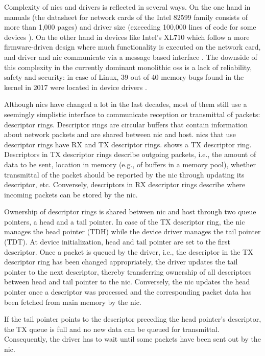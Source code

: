 Complexity of \acp{nic} and drivers is reflected in several ways. On the one
hand in manuals (the datasheet for network cards of the Intel 82599 family
\cite{intel2019datasheet} consists of more than 1,000 pages) and driver size
(exceeding 100,000 lines of code for some devices \cite{emmerich2019case}). On
the other hand in devices like Intel's XL710 which follow a more firmware-driven
design where much functionality is executed on the network card, and driver and
\ac{nic} communicate via a message based interface \cite{emmerich2019user}. The
downside of this complexity in the currently dominant monolithic \aclp{os} is a
lack of reliability, safety and security: in case of Linux, 39 out of 40 memory
bugs found in the kernel in 2017 were located in device drivers
\cite{emmerich2019case}.

Although \acp{nic} have changed a lot in the last decades, most of them still
use a seemingly simplistic interface to communicate reception or transmittal of
packets: descriptor rings. Descriptor rings are circular buffers that contain
information about network packets and are shared between \ac{nic} and host.
\acp{nic} that use descriptor rings have RX and TX descriptor rings.
 shows a TX descriptor ring. Descriptors in TX descriptor
rings describe outgoing packets, i.e., the amount of data to be sent, location
in memory (e.g., of buffers in a memory pool), whether transmittal of the packet
should be reported by the \ac{nic} through updating its descriptor, etc.
Conversely, descriptors in RX descriptor rings describe where incoming packets
can be stored by the \ac{nic}.

Ownership of descriptor rings is shared between \ac{nic} and host through two
queue pointers, a head and a tail pointer. In case of the TX descriptor ring,
the \ac{nic} manages the head pointer (TDH) while the device driver manages the
tail pointer (TDT). At device initialization, head and tail pointer are set to
the first descriptor. Once a packet is queued by the driver, i.e., the
descriptor in the TX descriptor ring has been changed appropriately, the driver
updates the tail pointer to the next descriptor, thereby transferring ownership
of all descriptors between head and tail pointer to the \ac{nic}. Conversely,
the \ac{nic} updates the head pointer once a descriptor was processed and the
corresponding packet data has been fetched from main memory by the \ac{nic}.

If the tail pointer points to the descriptor preceding the head pointer's
descriptor, the TX queue is full and no new data can be queued for transmittal.
Consequently, the driver has to wait until some packets have been sent out by
the \ac{nic}.


